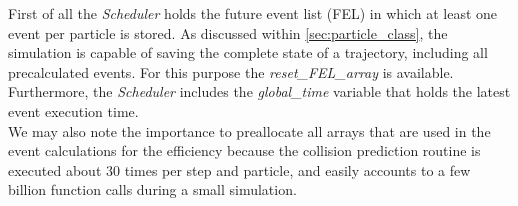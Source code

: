 First of all the \textit{Scheduler} holds the future event list (FEL) in which at least one event per particle is stored. As discussed within \autoref{sec:particle_class}, the simulation is capable of saving the complete state of a trajectory, including all precalculated events. For this purpose the \textit{reset\_FEL\_array} is available. Furthermore, the \textit{Scheduler} includes the \textit{global\_time} variable that holds the latest event execution time.\\

We may also note the importance to preallocate all arrays that are used in the event calculations for the efficiency because the collision prediction routine is executed about 30 times per step and particle, and easily accounts to a few billion function calls during a small simulation.

